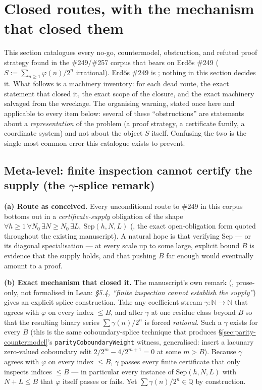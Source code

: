 \section{Closed routes, with the mechanism that closed them}

This section catalogues every no-go, countermodel, obstruction, and refuted
proof strategy found in the \#249/\#257 corpus that bears on Erd\H{o}s \#249
(\(S := \sum_{n\ge1}\varphi(n)/2^n\) irrational). Erd\H{o}s \#249 is
; nothing in this section decides it. What follows is a machinery
inventory: for each dead route, the exact statement that closed it, the exact
scope of the closure, and the exact machinery salvaged from the wreckage.
The organising warning, stated once here and applicable to every item below:
several of these ``obstructions'' are statements about a
\emph{representation} of the problem (a proof strategy, a certificate
family, a coordinate system) and not about the object \(S\) itself. Confusing
the two is the single most common error this catalogue exists to prevent.

\subsection{Meta-level: finite inspection cannot certify the supply (the
\texorpdfstring{\(\gamma\)}{gamma}-splice remark)}

\textbf{(a) Route as conceived.} Every unconditional route to \#249 in this
corpus bottoms out in a \emph{certificate-supply} obligation of the shape
\(\forall h\ge1\,\forall N_0\,\exists N\ge N_0\,\exists L,\ \mathrm{Sep}(h,N,L)\)
(, the exact
open-obligation form quoted throughout the existing manuscript). A natural
hope is that verifying \(\mathrm{Sep}\) — or its diagonal specialisation — at
every scale up to some large, explicit bound \(B\) is evidence that the
supply holds, and that pushing \(B\) far enough would eventually amount to a
proof.

\textbf{(b) Exact mechanism that closed it.} The manuscript's own remark
(, prose-only, not formalised in Lean:
\emph{\S5.4, ``finite inspection cannot establish the supply''}) gives an
explicit splice construction. Take any coefficient stream \(\gamma:\mathbb
N\to\mathbb N\) that agrees with \(\varphi\) on every index \(\le B\), and
alter \(\gamma\) at one residue class beyond \(B\) so that the resulting
binary series \(\sum\gamma(n)/2^n\) is forced \emph{rational}. Such a
\(\gamma\) exists for every \(B\) (this is the same coboundary-splice
technique that produces \S\ref{sec:parity-countermodel}'s
\texttt{parityCoboundaryWeight} witness, generalised: insert a lacunary
zero-valued coboundary edit \(2/2^m - 4/2^{m+1} = 0\) at some \(m>B\)). Because
\(\gamma\) agrees with \(\varphi\) on every index \(\le B\), \(\gamma\) passes
every finite certificate that only inspects indices \(\le B\) — in
particular every instance of \(\mathrm{Sep}(h,N,L)\) with \(N+L\le B\) that
\(\varphi\) itself passes or fails. Yet \(\sum\gamma(n)/2^n\in\mathbb Q\) by
construction.

